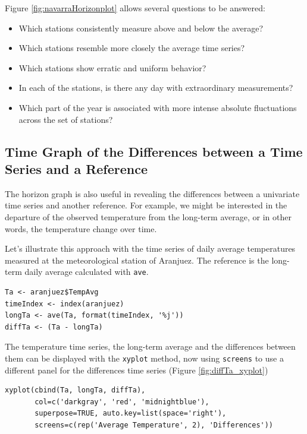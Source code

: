 Figure \ref{fig:navarraHorizonplot} allows several questions to be
answered:
\begin{itemize}
\item Which stations consistently measure above and below the average?
\item Which stations resemble more closely the average time series?
\item Which stations show erratic and uniform behavior?
\item In each of the stations, is there any day with extraordinary measurements?
\item Which part of the year is associated with more intense
absolute fluctuations across the set of stations?
\end{itemize}
\subsection{Time Graph of the Differences between a Time Series and a Reference}
\label{sec-2-3}
The horizon graph is also useful in revealing the differences between
a univariate time series and another reference. For example, we
might be interested in the departure of the observed temperature
from the long-term average, or in other words, the temperature
change over time.

Let's illustrate this approach with the time series of daily
average temperatures measured at the meteorological station of
Aranjuez. The reference is the long-term daily average calculated
with \texttt{ave}.

\lstset{language=R,numbers=none}
\begin{lstlisting}
Ta <- aranjuez$TempAvg
timeIndex <- index(aranjuez)
longTa <- ave(Ta, format(timeIndex, '%j'))
diffTa <- (Ta - longTa)
\end{lstlisting}


The temperature time series, the long-term average and the
differences between them can be displayed with the \texttt{xyplot}
method, now using \texttt{screens} to use a different panel for the
differences time series (Figure \ref{fig:diffTa_xyplot})
\lstset{language=R,numbers=none}
\begin{lstlisting}
xyplot(cbind(Ta, longTa, diffTa),
       col=c('darkgray', 'red', 'midnightblue'),
       superpose=TRUE, auto.key=list(space='right'),
       screens=c(rep('Average Temperature', 2), 'Differences'))
\end{lstlisting}

